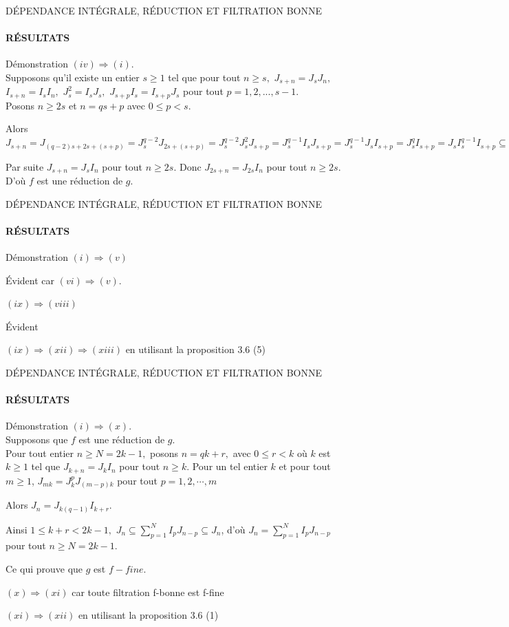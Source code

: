 \documentclass[11pt,a4paper]{beamer}
\begin{document}
\begin{frame}{DÉPENDANCE INTÉGRALE, RÉDUCTION ET FILTRATION BONNE}
	\framesubtitle{RÉSULTATS}
	\begin{block}{Démonstration}
		$(iv)\Longrightarrow (i).$\\
		Supposons qu'il existe un entier $s\geq 1$ tel que pour tout $n\geq s,$ $J_{s+n}=J_{s}J_{n},$ $I_{s+n}=I_{s}I_{n},$ $J_{s}^{2}=I_{s}J_{s},$ $J_{s+p}I_{s}=I_{s+p}J_{s}$ pour tout $p=1,2,...,s-1$.\\
		Posons $n\geq 2s$ et $n=qs+p$ avec $0\leq p<s.$
		
		Alors $J_{s+n}=J_{(q-2)s+2s+(s+p)}=J_{s}^{q-2}J_{2s+(s+p)}=J_{s}^{q-2}J_{s}^{2}J_{s+p}=J_{s}^{q-1}I_{s}J_{s+p}=J_{s}^{q-1}J_{s}I_{s+p}=J_{s}^{q}I_{s+p}=J_{s}I_{s}^{q-1}I_{s+p}\subseteq J_{s}I_{n}\subseteq J_{s+n}.
		$
		
		Par suite $J_{s+n}=J_{s}I_{n}$ pour tout $n\geq 2s.$ Donc $
		J_{2s+n}=J_{2s}I_{n}$ pour tout $n\geq 2s.$ D'où $f$ est une réduction de $g.$
		
		
		
	\end{block}
\end{frame}

\begin{frame}{DÉPENDANCE INTÉGRALE, RÉDUCTION ET FILTRATION BONNE}
	\framesubtitle{RÉSULTATS}
	\begin{block}{Démonstration}
		$(i)\Longrightarrow (v)$
		
		Évident car $(vi)\Longrightarrow (v).$
		
		$(ix)\Longrightarrow (viii)$
		
		Évident
		
		$(ix)\Longrightarrow (xii)\Longrightarrow (xiii)$ en utilisant la proposition 3.6 (5)
		
	\end{block}
\end{frame}

\begin{frame}{DÉPENDANCE INTÉGRALE, RÉDUCTION ET FILTRATION BONNE}
	\framesubtitle{RÉSULTATS}
	\begin{block}{Démonstration}
		$(i)\Longrightarrow (x).$ \\
		Supposons que $f$ est une réduction de $g.$\\
		Pour tout entier $n\geq N=2k-1,$ posons $n=qk+r,$ avec $0\leq r<k$ où $k$
		est $k \geqslant 1$ tel que $J_{k+n}  = J_{k}I_n$ pour tout $n \geqslant k$. Pour un tel entier $k$ et pour tout $m \geqslant 1$, $J_{mk}=J_{k}^{p}J_{(m-p)k}
		$ pour tout $p=1,2,\cdots,m$
		
		Alors $J_{n}=J_{k(q-1)}I_{k+r}.$
		
		Ainsi $1\leq k+r<2k-1,$ $J_{n}\subseteq
		\sum\limits_{p=1}^{N}I_{p}J_{n-p}\subseteq J_{n}$, d'où $J_{n}=\sum\limits_{p=1}^{N}I_{p}J_{n-p}$ pour tout $n\geq N=2k-1$.
		
		Ce qui prouve que $g$ est $f-fine.$
		
		$(x)\Longrightarrow (xi)$ car toute filtration f-bonne est f-fine
		
		$(xi)\Longrightarrow (xii)$ en utilisant la proposition 3.6 (1)
	\end{block}
\end{frame}
\end{document}
